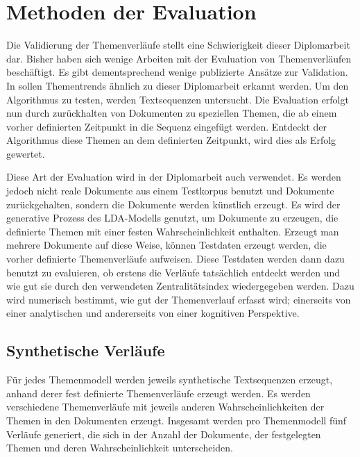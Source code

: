 \section{Methoden der Evaluation}
\label{sec:centralityEvaluation}
Die Validierung der Themenverläufe stellt eine Schwierigkeit dieser Diplomarbeit dar. Bisher haben sich wenige Arbeiten mit der Evaluation von Themenverläufen beschäftigt. Es gibt dementsprechend wenige publizierte Ansätze zur Validation. In \citep{onlineLDA2} sollen Thementrends ähnlich zu dieser Diplomarbeit erkannt werden. Um den Algorithmus zu testen, werden Textsequenzen untersucht. Die Evaluation erfolgt nun durch zurückhalten von Dokumenten zu speziellen Themen, die ab einem vorher definierten Zeitpunkt in die Sequenz eingefügt werden. Entdeckt der Algorithmus diese Themen an dem definierten Zeitpunkt, wird dies als Erfolg gewertet. 

Diese Art der Evaluation wird in der Diplomarbeit auch verwendet. Es werden jedoch nicht reale Dokumente aus einem Testkorpus benutzt und Dokumente zurückgehalten, sondern die Dokumente werden künstlich erzeugt. Es wird der generative Prozess des LDA-Modells genutzt, um Dokumente zu erzeugen, die definierte Themen mit einer festen Wahrscheinlichkeit enthalten. Erzeugt man mehrere Dokumente auf diese Weise, können Testdaten erzeugt werden, die vorher definierte Themenverläufe aufweisen. Diese Testdaten werden dann dazu benutzt zu evaluieren, ob erstens die Verläufe tatsächlich entdeckt werden und wie gut sie durch den verwendeten Zentralitätsindex wiedergegeben werden. Dazu wird numerisch bestimmt, wie gut der Themenverlauf erfasst wird; einerseits von einer analytischen und andererseits von einer kognitiven Perspektive.

\subsection{Synthetische Verläufe}

Für jedes Themenmodell werden jeweils synthetische Textsequenzen erzeugt, anhand derer fest definierte Themenverläufe erzeugt werden. Es werden verschiedene Themenverläufe mit jeweils anderen Wahrscheinlichkeiten der Themen in den Dokumenten erzeugt. Insgesamt werden pro Themenmodell fünf Verläufe generiert, die sich in der Anzahl der Dokumente, der festgelegten Themen und deren Wahrscheinlichkeit unterscheiden. 

